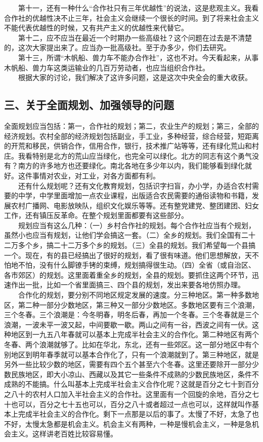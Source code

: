 \documentclass[cn,11pt,chinese]{elegantbook}
\def\myformat#1{\hfil\hfil #1}
\begin{document}
　　第十一，还有一种什么“合作社只有三年优越性”的说法，这是悲观主义。我看合作社的优越性决不止三年，社会主义会继续一个很长的时间。到了将来社会主义不能代表优越性的时候，又有共产主义的优越性来代替它。\\
　　第十二，应不应当在最近一个时期办一些高级社？这个问题在过去是不清楚的，这次大家提出来了。应当办一批高级社。至于办多少，你们去研究。\\
　　第十三，所谓“木帆船、兽力车不能办合作社”，这也不对。今天看起来，从事木帆船、兽力车这类运输业的几百万劳动者，也应当组织合作社。\\
　　根据大家的讨论，我们解决了这许多问题，这是这次中央全会的重大收获。\\
\subsection*{\myformat{三、关于全面规划、加强领导的问题}}
全面规划应当包括：第一，合作社的规划；第二，农业生产的规划；第三，全部的经济规划。农村全部的经济规划包括副业，手工业，多种经营，综合经营，短距离的开荒和移民，供销合作，信用合作，银行，技术推广站等等，还有绿化荒山和村庄。我看特别是北方的荒山应当绿化，也完全可以绿化。北方的同志有这个勇气没有？南方的许多地方也还要绿化。南北各地在多少年以内，我们能够看到绿化就好。这件事情对农业，对工业，对各方面都有利。\\
　　还有什么规划呢？还有文化教育规划，包括识字扫盲，办小学，办适合农村需要的中学，中学里面增加一点农业课程，出版适合农民需要的通俗读物和书籍，发展农村广播网、电影放映队，组织文化娱乐等等。还有整党建党、整团建团、妇女工作，还有镇压反革命。在整个规划里面都要有这些部分。\\
　　规划应当有这么几种：（一）乡村合作社的规划。每个合作社应当有个规划，虽然小也应当有规划，让他们学会搞这一套。（二）全乡的规划。我们全国有二十二万多个乡，搞二十二万多个乡的规划。（三）全县的规划。我们希望每一个县搞一个。现在，有的县已经搞出了很好的规划，看了很有味道。他们思想解放，天不怕地不怕，没有什么脚镣手铐的束缚，规划搞得很生动。（四）全省（或自治区、各市郊区）的规划。这里面着重全乡的规划，全县的规划。要抓住这两个环节，迅速作出一批，比如一个省里面搞三、四个县的规划，发出来要各地仿照办理。\\
　　合作化的规划，要分别不同地区规定发展的速度。分三种地区。第一种多数地区，第二种一部分少数地区，第三种又一部分少数地区。多数地区要有三个浪潮，三个冬春。三个浪潮是：今冬明春，明冬后春，再加一个冬春。三个冬春就是三个浪潮，一波未平一波又起，中间要歇一歇。两山之间有一谷，西波之间有一伏。这种地区到一九五八年春就可以基本上完成半社会主义的合作化。第二种地区有两个冬春、两个浪潮就够了。比如在华北，东北，还有一些郊区。这一部分地区中有个别地区到明年春季就可以基本合作化了，只有一个浪潮就到了。第三种地区，就是另外一些比较少数的地区，需要有四个五个甚至六个冬春。这里还要除开一部分少数民族地区，即大小凉山、西藏以及其它一些条件不成熟的少数民族地区，条件不成熟的不能搞。什么叫基本上完成半社会主义合作化呢？这就是百分之七十到百分之八十的农村人口加入半社会主义的合作社。这里面有一个回旋的余地，百分之七十也可以，百分之七十五也可以，百分之八十或者超过一点也可以，这样就叫作基本上完成半社会主义的合作化。剩下一点那是以后的事了。太慢了不好，太急了也不好，太慢太急都是机会主义。机会主义有两种，一种是慢机会主义，一种是急机会主义。这样讲老百姓比较容易懂。\\
\end{document}
